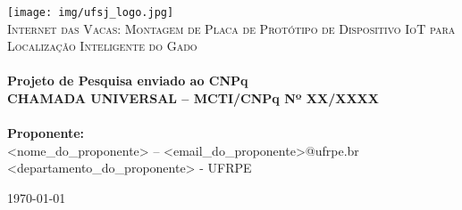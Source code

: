 \begin{titlepage}
\begin{center}


\texttt{[image: img/ufsj\_logo.jpg]}~\\[1cm]

\textsc{\Large Internet das Vacas: Montagem de Placa de Protótipo de
Dispositivo IoT para Localização Inteligente do Gado}\\[3cm]


\HRule \\[0.4cm]
{\large \bfseries Projeto de Pesquisa enviado ao CNPq \\
CHAMADA UNIVERSAL – MCTI/CNPq Nº XX/XXXX \\[0.4cm]}
\HRule \\[4cm]

\large\textbf{Proponente:}\\
<nome\_do\_proponente> – <email\_do\_proponente>@ufrpe.br\\
<departamento\_do\_proponente> - UFRPE\\[3cm]

\vfill

{\large \today}

\end{center}
\end{titlepage}